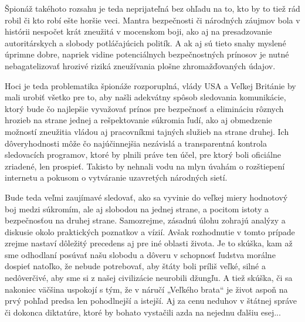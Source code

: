 \documentclass{article}
\begin{document}
Špionáž takéhoto rozsahu je teda neprijateľná bez ohľadu na to, kto by to tiež rád robil či kto robí ešte horšie veci. Mantra bezpečnosti či národných záujmov bola v histórii nespočet krát zneužitá v mocenskom boji, ako aj na presadzovanie autoritárskych a slobody potláčajúcich politík. A ak aj sú tieto snahy myslené úprimne dobre, napriek vidine potenciálnych bezpečnostných prínosov je nutné nebagatelizovať hrozivé riziká zneužívania plošne zhromažďovaných údajov.

Hoci je teda problematika špionáže rozporuplná, vlády USA a Veľkej Británie by mali urobiť všetko pre to, aby našli adekvátny spôsob sledovania komunikácie, ktorý bude čo najlepšie vyvažovať prínos pre bezpečnosť a elimináciu rôznych hrozieb na strane jednej a rešpektovanie súkromia ľudí, ako aj obmedzenie možností zneužitia vládou aj pracovníkmi tajných služieb na strane druhej. Ich dôveryhodnosti môže čo najúčinnejšia nezávislá a transparentná kontrola sledovacích programov, ktoré by plnili práve ten účel, pre ktorý boli oficiálne zriadené, len prospieť. Takisto by nehnali vodu na mlyn úvahám o rozštiepení internetu a pokusom o vytváranie uzavretých národných sietí.

Bude teda veľmi zaujímavé sledovať, ako sa vyvinie do veľkej miery hodnotový boj medzi súkromím, ale aj slobodou na jednej strane, a pocitom istoty a bezpečnosťou na druhej strane. Samozrejme, zásadnú úlohu zohrajú analýzy a diskusie okolo praktických poznatkov a vízií. Avšak rozhodnutie v tomto prípade zrejme nastaví dôležitý precedens aj pre iné oblasti života. Je to skúška, kam až sme odhodlaní posúvať našu slobodu a dôveru v schopnosť ľudstva morálne dospieť natoľko, že nebude potrebovať, aby štáty boli príliš veľké, silné a nedôverčivé, aby sme si z našej civilizácie neurobili džungľu. A tiež skúška, či sa nakoniec väčšina uspokojí s tým, že v náručí „Veľkého brata“ je život aspoň na prvý pohľad predsa len pohodlnejší a istejší. Aj za cenu neduhov v štátnej správe či dokonca diktatúre, ktoré by bohato vystačili azda na nejednu ďalšiu esej...

\printbibliography
\end{document}
